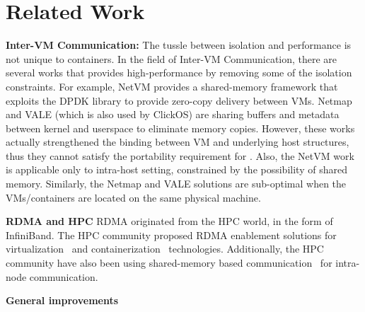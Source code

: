 \section{Related Work} \label{sec:related}


\textbf{Inter-VM Communication:} 
The tussle between isolation and performance is not unique to containers.
In the field of Inter-VM Communication, there are several works that provides
high-performance by removing some of the isolation constraints.
For example, NetVM\cite{netvm} provides a shared-memory framework that
exploits the DPDK library to provide zero-copy delivery between VMs.
Netmap\cite{netmap} and VALE\cite{vale} (which is also used by ClickOS\cite{clickos}) 
are sharing buffers and metadata between kernel and userspace to eliminate memory copies.
However, these works actually strengthened the binding between VM and underlying host
structures, thus they cannot satisfy the portability requirement for \sysname. 
Also, the NetVM work is applicable only to intra-host setting,
constrained by the possibility of shared memory. Similarly, the Netmap
and VALE solutions are sub-optimal when the VMs/containers are located
on the same physical machine.

\textbf{RDMA and HPC}
RDMA originated from the HPC world, in the form of InfiniBand. The HPC community proposed RDMA enablement solutions for virtualization~\cite{ranadive2012toward} and containerization~\cite{rdmacontainers} technologies. Additionally, the HPC community have also been using shared-memory based communication~\cite{KNEM} for intra-node communication.

\textbf{General improvements}

